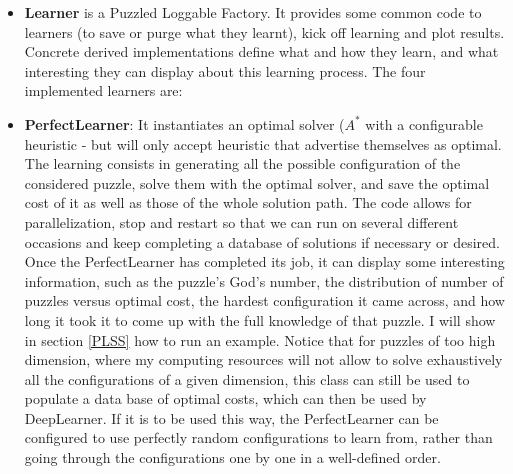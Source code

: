 \begin{itemize}
\item \textbf{Learner} is a Puzzled Loggable Factory. It provides some common code to learners (to save or purge what they learnt), kick off learning and plot results. Concrete derived implementations define what and how they learn, and what interesting they can display about this learning process. The four implemented learners are:
\item \textbf{PerfectLearner}: It instantiates an optimal solver ($A^{*}$ with a configurable heuristic - but will only accept heuristic that advertise themselves as optimal. The learning consists in generating all the possible configuration of the considered puzzle, solve them with the optimal solver, and save the optimal cost of it as well as those of the whole solution path. The code allows for parallelization, stop and restart so that we can run on several different occasions and keep completing a database of solutions if necessary or desired. Once the PerfectLearner has completed its job, it can display some interesting information, such as the puzzle's God's number, the distribution of number of puzzles versus optimal cost, the hardest configuration it came across, and how long it took it to come up with the full knowledge of that puzzle. I will show in section \ref{PLSS} how to run an example. Notice that for puzzles of too high dimension, where my computing resources will not allow to solve exhaustively all the configurations of a given dimension, this class can still be used to populate a data base of optimal costs, which can then be used by DeepLearner. If it is to be used this way, the PerfectLearner can be configured to use perfectly random configurations to learn from, rather than going through the configurations one by one in a well-defined order.


\end{itemize}
